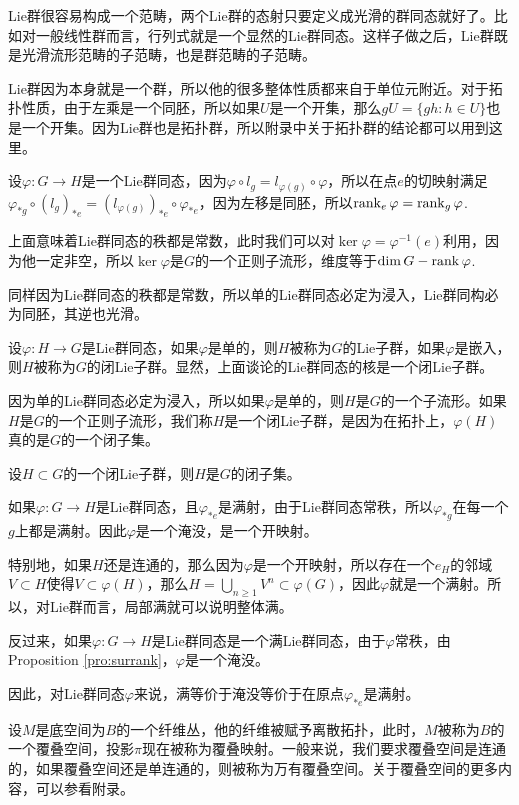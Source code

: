 Lie群很容易构成一个范畴，两个Lie群的态射只要定义成光滑的群同态就好了。比如对一般线性群而言，行列式就是一个显然的Lie群同态。这样子做之后，Lie群既是光滑流形范畴的子范畴，也是群范畴的子范畴。

Lie群因为本身就是一个群，所以他的很多整体性质都来自于单位元附近。对于拓扑性质，由于左乘是一个同胚，所以如果$U$是一个开集，那么$gU=\{gh:h\in U\}$也是一个开集。因为Lie群也是拓扑群，所以附录中关于拓扑群的结论都可以用到这里。

\para 设$\varphi:G\to H$是一个Lie群同态，因为$\varphi\circ l_g=l_{\varphi(g)}\circ \varphi$，所以在点$e$的切映射满足$\varphi_{*g}\circ (l_g)_{*e}=(l_{\varphi(g)})_{*e}\circ \varphi_{*e}$，因为左移是同胚，所以$\operatorname{rank}_e \varphi=\operatorname{rank}_g \varphi$.

上面意味着Lie群同态的秩都是常数，此时我们可以对$\ker \varphi=\varphi^{-1}(e)$利用，因为他一定非空，所以$\ker \varphi$是$G$的一个正则子流形，维度等于$\dim G-\operatorname{rank} \varphi$.

同样因为Lie群同态的秩都是常数，所以单的Lie群同态必定为浸入，Lie群同构必为同胚，其逆也光滑。

\para 设$\varphi:H\to G$是Lie群同态，如果$\varphi$是单的，则$H$被称为$G$的Lie子群，如果$\varphi$是嵌入，则$H$被称为$G$的闭Lie子群。显然，上面谈论的Lie群同态的核是一个闭Lie子群。

因为单的Lie群同态必定为浸入，所以如果$\varphi$是单的，则$H$是$G$的一个子流形。如果$H$是$G$的一个正则子流形，我们称$H$是一个闭Lie子群，是因为在拓扑上，$\varphi(H)$真的是$G$的一个闭子集。

\pro 设$H\subset G$的一个闭Lie子群，则$H$是$G$的闭子集。

\para 如果$\varphi:G\to H$是Lie群同态，且$\varphi_{*e}$是满射，由于Lie群同态常秩，所以$\varphi_{*g}$在每一个$g$上都是满射。因此$\varphi$是一个淹没，是一个开映射。

特别地，如果$H$还是连通的，那么因为$\varphi$是一个开映射，所以存在一个$e_H$的邻域$V\subset H$使得$V\subset \varphi(H)$，那么$H=\bigcup_{n\geq 1}V^n\subset \varphi(G)$，因此$\varphi$就是一个满射。所以，对Lie群而言，局部满就可以说明整体满。

反过来，如果$\varphi:G\to H$是Lie群同态是一个满Lie群同态，由于$\varphi$常秩，由Proposition \eqref{pro:surrank}，$\varphi$是一个淹没。

因此，对Lie群同态$\varphi$来说，满等价于淹没等价于在原点$\varphi_{*e}$是满射。

\para \label{covering_space}设$M$是底空间为$B$的一个纤维丛，他的纤维被赋予离散拓扑，此时，$M$被称为$B$的一个覆叠空间，投影$\pi$现在被称为覆叠映射。一般来说，我们要求覆叠空间是连通的，如果覆叠空间还是单连通的，则被称为万有覆叠空间。关于覆叠空间的更多内容，可以参看附录。

